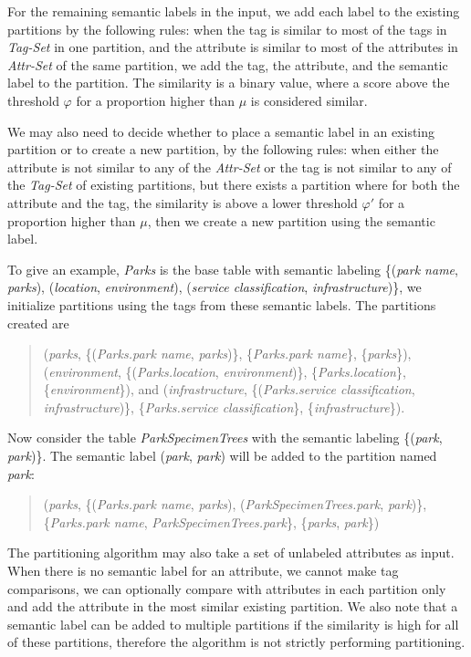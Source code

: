 For the remaining semantic labels in the input, we add each label to the existing partitions by the following rules: when the tag is similar to most of the tags in \textit{Tag-Set} in one partition, and the attribute is similar to most of the attributes in \textit{Attr-Set} of the same partition, we add the tag, the attribute, and the semantic label to the partition. The similarity is a binary value, where a score above the threshold $\varphi$ for a proportion higher than $\mu$ is considered similar. 

We may also need to decide whether to place a semantic label in an existing partition or to create a new partition, by the following rules: when either the attribute is not similar to any of the \textit{Attr-Set} or the tag is not similar to any of the \textit{Tag-Set} of existing partitions, but there exists a partition where for both the attribute and the tag, the similarity is above a lower threshold $\varphi '$ for a proportion higher than $\mu$, then we create a new partition using the semantic label.

To give an example, \textit{Parks} is the base table with semantic labeling \{(\textit{park name}, \textit{parks}), (\textit{location}, \textit{environment}), (\textit{service classification}, \textit{infrastructure})\}, we initialize partitions using the tags from these semantic labels. The partitions created are
\begin{quote}
(\textit{parks}, \{(\textit{Parks.park name}, \textit{parks})\}, \{\textit{Parks.park name}\}, \{\textit{parks}\}),
(\textit{environment}, \{(\textit{Parks.location}, \textit{environment})\}, \{\textit{Parks.location}\}, \{\textit{environment}\}), and
(\textit{infrastructure}, \{(\textit{Parks.service classification}, \textit{infrastructure})\}, \{\textit{Parks.service classification}\}, \{\textit{infrastructure}\}).
\end{quote}

Now consider the table \textit{ParkSpecimenTrees} with the semantic labeling \{(\textit{park}, \textit{park})\}. The semantic label (\textit{park}, \textit{park}) will be added to the partition named \textit{park}:
\begin{quote}
(\textit{parks}, \{(\textit{Parks.park name}, \textit{parks}), (\textit{ParkSpecimenTrees.park}, \textit{park})\}, \{\textit{Parks.park name}, \textit{ParkSpecimenTrees.park}\}, \{\textit{parks}, \textit{park}\})
\end{quote}

The partitioning algorithm may also take a set of unlabeled attributes as input. When there is no semantic label for an attribute, we cannot make tag comparisons, we can optionally compare with attributes in each partition only and add the attribute in the most similar existing partition. We also note that a semantic label can be added to multiple partitions if the similarity is high for all of these partitions, therefore the algorithm is not strictly performing partitioning.
\endinput
